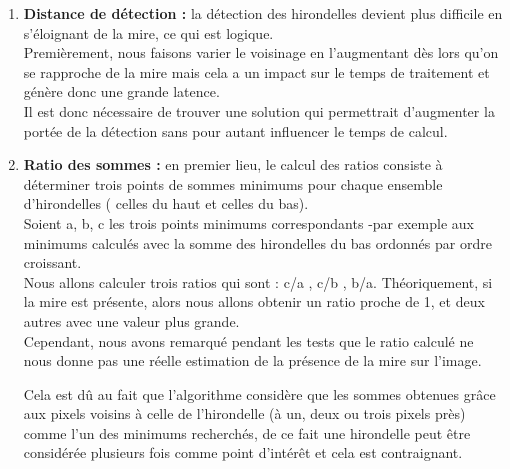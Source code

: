 \documentclass[12pt]{article}
\begin{document}
\begin{enumerate}
\item \textbf{Distance de détection : } la détection des hirondelles devient plus difficile en s'éloignant de la mire, ce qui est logique.\\ Premièrement, nous faisons varier le voisinage en l'augmentant dès lors qu'on se rapproche de la mire mais cela a un impact sur le temps de traitement et génère donc une grande latence.\\ Il est donc nécessaire de trouver une solution qui permettrait d'augmenter la portée de la détection sans pour autant influencer le temps de calcul.  

\item \textbf{Ratio des sommes : } en premier lieu, le calcul des ratios consiste à déterminer trois points de sommes minimums pour chaque ensemble d’hirondelles ( celles du haut et celles du bas). \\
Soient a, b, c les trois points minimums correspondants -par exemple aux minimums calculés avec la somme des hirondelles du bas ordonnés par ordre croissant. \\
Nous allons calculer trois ratios qui sont : c/a , c/b , b/a. Théoriquement, si la mire est présente, alors nous allons obtenir un ratio proche de 1, et deux autres avec une valeur plus grande.\\ 
Cependant, nous avons remarqué pendant les tests que le ratio calculé ne nous donne pas une réelle estimation de la présence de la mire sur l’image. 


Cela est dû au fait que l'algorithme considère que les sommes obtenues grâce aux pixels voisins à celle de l’hirondelle (à un, deux ou trois pixels près) comme l’un des minimums recherchés, de ce fait une hirondelle peut être considérée plusieurs fois comme point d’intérêt et cela est contraignant. \\


\end{enumerate}
\end{document}
